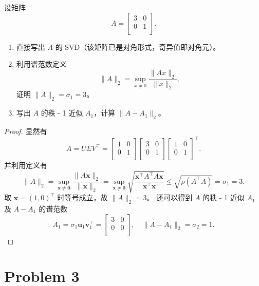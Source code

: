 设矩阵
\[A =
\begin{bmatrix}
    3 & 0 \\
    0 & 1 \\
\end{bmatrix}.
\]
\begin{enumerate}
    \item 直接写出 $A$ 的 SVD（该矩阵已是对角形式，奇异值即对角元）。
    \item 利用谱范数定义 \[\|A\|_2 = \sup_{x \neq 0} \frac{\|Ax\|_2}{\|x\|_2},\]证明 $\|A\|_2 = \sigma_1 = 3$。
    \item 写出 $A$ 的秩 - 1 近似 $A_1$，计算 $\|A - A_1\|_2$。
\end{enumerate}

\begin{proof}
    显然有 \[
    A = U \Sigma V^\top = \begin{bmatrix}
        1 & 0 \\
        0 & 1 \\
    \end{bmatrix} \begin{bmatrix}
        3 & 0 \\
        0 & 1 \\
    \end{bmatrix} \begin{bmatrix}
        1 & 0 \\
        0 & 1 \\
    \end{bmatrix}^\top.
    \]
    并利用定义有 \[
\|A\|_2 = \sup_{\boldsymbol{x} \neq \boldsymbol{0}} \frac{\|A\boldsymbol{x}\|_2}{\|\boldsymbol{x}\|_2} = \sup_{\boldsymbol{x} \neq \boldsymbol{0}} \sqrt{\frac{\boldsymbol{x}^\top A^\top A \boldsymbol{x}}{\boldsymbol{x}^\top \boldsymbol{x}}} \le \sqrt{\rho \left(A^\top A\right)} = \sigma_1 = 3.
    \]
    取 $\boldsymbol{x}=(1,0)^\top$ 时等号成立，故 $\|A\|_2=3$。
    还可以得到 $A$ 的秩 - 1 近似 $A_1$ 及 $A - A_1$ 的谱范数
    \[
    A_1 = \sigma_1 \boldsymbol{u}_1 \boldsymbol{v}_1^\top = \begin{bmatrix}
        3 & 0 \\
        0 & 0 \\
    \end{bmatrix}, \quad \|A - A_1\|_2 = \sigma_2 = 1.
    \]
\end{proof}

\section*{Problem 3}

